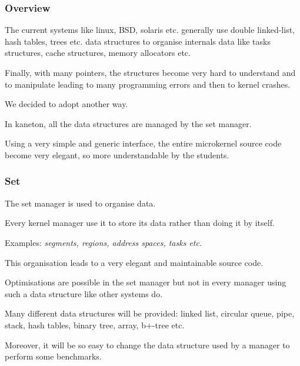 \begin{frame}
  \frametitle{Overview}

  The current systems like linux, BSD, solaris etc. generally use
  double linked-list, hash tables, trees etc. data structures to
  organise internals data like tasks structures, cache structures,
  memory allocators etc.

  \-

  Finally, with many pointers, the structures become very hard to understand
  and to manipulate leading to many programming errors and then to kernel
  crashes.

  \-

  We decided to adopt another way.

  \-

  In kaneton, all the data structures are managed by the set manager.

  \-

  Using a very simple and generic interface, the entire microkernel source
  code become very elegant, so more understandable by the students.
\end{frame}


\begin{frame}
  \frametitle{Set}

  The set manager is used to organise data.

  \-

  Every kernel manager use it to store its data rather than doing it
  by itself.

  \-

  Examples: \textit{segments, regions, address spaces, tasks etc.}

  \-

  This organisation leads to a very elegant and maintainable source code.

  \-

  Optimisations are possible in the set manager \alert{but} not in every
  manager using such a data structure like other systems do.

  \-

  Many different data structures will be provided: linked list, circular
  queue, pipe, stack, hash tables, binary tree, array, b+-tree etc.

  \-

  Moreover, it will be so easy to change the data structure used by a manager
  to perform some benchmarks.
\end{frame}

